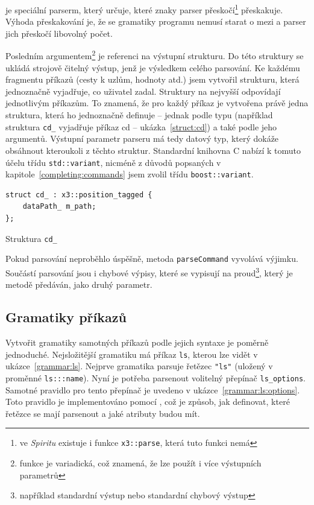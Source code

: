 \documentclass[thesis=B,czech,hidelinks]{FITthesis}[2019/03/06]
\newcommand{\Rplus}{\protect\hspace{-.1em}\protect\raisebox{.35ex}{\smaller{\smaller\textbf{+}}}}
\newcommand{\Cpp}{\mbox{C\Rplus\Rplus}\xspace}
\begin{document}
 je speciální parserm, který určuje, které znaky parser přeskočí\footnote{ve \textit{Spiritu} existuje i funkce \texttt{x3::parse}, která tuto funkci nemá} přeskakuje. Výhoda přeskakování je, že se gramatiky programu nemusí starat o mezi a parser jich přeskočí libovolný počet.

Posledním argumentem\footnote{funkce je variadická, což znamená, že lze použít i více výstupních parametrů} je referenci na výstupní strukturu. Do této struktury se ukládá strojově čitelný výstup, jenž je výsledkem celého parsování. Ke každému fragmentu příkazů (cesty k uzlům, hodnoty atd.) jsem vytvořil strukturu, která jednoznačně vyjadřuje, co uživatel zadal. Struktury na nejvyšší odpovídají jednotlivým příkazům. To znamená, že pro každý příkaz je vytvořena právě jedna struktura, která ho jednoznačně definuje -- jednak podle typu (například struktura \texttt{cd\_} vyjadřuje příkaz cd -- ukázka~\ref{struct:cd}) a také podle jeho argumentů. Výstupní parametr parseru má tedy datový typ, který dokáže obsáhnout kteroukoli z těchto struktur. Standardní knihovna \Cpp{} nabízí k tomuto účelu třídu \texttt{std::variant}, nicméně z důvodů popsaných v kapitole~\ref{completing:commands} jsem zvolil třídu \texttt{boost::variant}.

\begin{listing}
\begin{verbatim}
struct cd_ : x3::position_tagged {
    dataPath_ m_path;
};
\end{verbatim}
\caption{Struktura \texttt{cd\_}}\label{struct:cd}
\end{listing}

Pokud parsování neproběhlo úspěšně, metoda \texttt{parseCommand} vyvolává výjimku. Součástí parsování jsou i chybové výpisy, které se vypisují na proud\footnote{například standardní výstup nebo standardní chybový výstup}, který je metodě předáván, jako druhý parametr.

\subsection{Gramatiky příkazů}
Vytvořit gramatiky samotných příkazů podle jejich syntaxe je poměrně jednoduché. Nejsložitější gramatiku má příkaz \texttt{ls}, kterou lze vidět v ukázce~\ref{grammar:ls}. Nejprve gramatika parsuje řetězec \verb¨"ls"¨ (uložený v proměnné \verb¨ls:::name¨). Nyní je potřeba parsenout volitelný přepínač \verb¨ls_options¨. Samotné pravidlo pro tento přepínač je uvedeno v ukázce~\ref{grammar:ls:options}. Toto pravidlo je implementováno pomocí , což je způsob, jak definovat, které řetězce se mají parsenout a jaké atributy budou mít.
\end{document}
